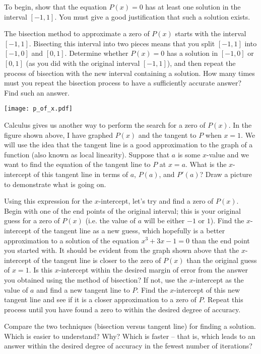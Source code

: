 \documentclass
[justified,nohyper]
{tufte-handout}
\theoremstyle{mydef}
\begin{document}
To begin, show that the equation $P(x)=0$ has at least one solution in the interval $[-1,1]$. You must give a good justification that such a solution exists.

The bisection method to approximate a zero of $P(x)$ starts with the interval $[-1,1]$. Bisecting this interval into two pieces means that you split $[-1,1]$ into $[-1,0]$ and $[0,1]$. Determine whether $P(x)=0$ has a solution in $[-1,0]$ or $[0,1]$ (as you did with the original interval $[-1,1]$), and then repeat the process of bisection with the new interval containing a solution. How many times must you repeat the bisection process to have a sufficiently accurate answer? Find such an answer.

\newpage

\texttt{[image: p\_of\_x.pdf]}

Calculus gives us another way to perform the search for a zero of $P(x)$. In the figure shown above, I have graphed $P(x)$ and the tangent to $P$ when $x=1$. We will use the idea that the tangent line is a good approximation to the graph of a function (also known as local linearity). Suppose that $a$ is some $x$-value and we want to find the equation of the tangent line to $P$ at $x=a$. What is the $x$-intercept of this tangent line in terms of $a$, $P(a)$, and $P'(a)$? Draw a picture to demonstrate what is going on.

Using this expression for the $x$-intercept, let's try and find a zero of $P(x)$. Begin with one of the end points of the original interval; this is your original guess for a zero of $P(x)$ (i.e. the value of $a$ will be either $-1$ or $1$). Find the $x$-intercept of the tangent line as a new guess, which hopefully is a better approximation to a solution of the equation $x^3+3x-1=0$ than the end point you started with. It should be evident from the graph shown above that the $x$-intercept of the tangent line is closer to the zero of $P(x)$ than the original guess of $x=1$. Is this $x$-intercept within the desired margin of error from the answer you obtained using the method of bisection? If not, use the $x$-intercept as the value of $a$ and find a new tangent line to $P$. Find the $x$-intercept of this new tangent line and see if it is a closer approximation to a zero of $P$. Repeat this process until you have found a zero to within the desired degree of accuracy.

Compare the two techniques (bisection versus tangent line) for finding a solution. Which is easier to understand? Why? Which is faster -- that is, which leads to an answer within the desired degree of accuracy in the fewest number of iterations?
\end{document}
